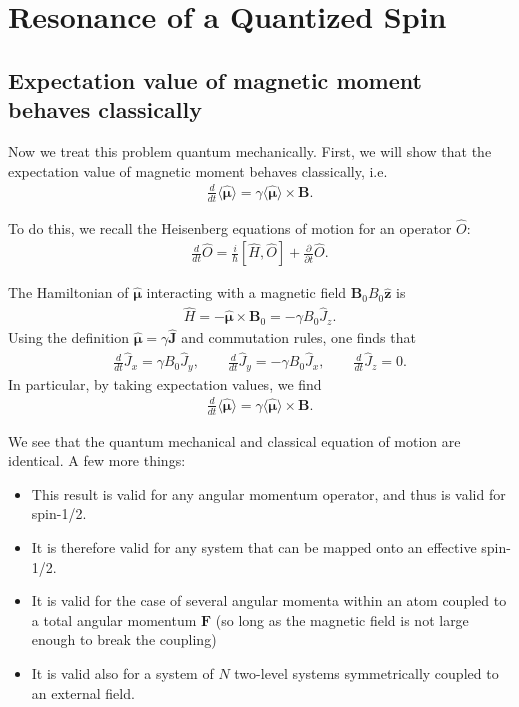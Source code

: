 \documentclass{book}
\theoremstyle{definition}
\newcommand{\p}{\partial}
\newcommand{\f}[2]{\frac{#1}{#2}}
\begin{document}
\section{Resonance of a Quantized Spin}




\subsection{Expectation value of magnetic moment behaves classically}


Now we treat this problem quantum mechanically. First, we will show that the expectation value of magnetic moment behaves classically, i.e. 
\begin{align*}
	\f{d}{dt}\langle \hat{\bm{\mu}} \rangle = \gamma \langle \hat{\bm{\mu}}\rangle \times \bm{B}.
\end{align*}

To do this, we recall the Heisenberg equations of motion for an operator $\hat{O}$:
\begin{align*}
	\f{d}{dt}\hat{O} = \f{i}{\hbar}[\hat{H}, \hat{O}] + \f{\p}{\p t}\hat{O}.
\end{align*}

The Hamiltonian of $\hat{\bm{\mu}}$ interacting with a magnetic field $\bm{B}_0  B_0 \hat{\bm{z}}$ is
\begin{align*}
	\hat{H} = -\hat{\bm{\mu}} \times \bm{B}_0 = -\gamma B_0 \hat{J}_z.
\end{align*}
Using the definition $\hat{\bm{\mu}} = \gamma \hat{\bm{J}}$ and commutation rules, one finds that 
\begin{align*}
	\f{d}{dt}\hat{J}_x = \gamma B_0 \hat{J}_y, \quad\quad \f{d}{dt}\hat{J}_y = -\gamma B_0 \hat{J}_x, \quad\quad \f{d}{dt}\hat{J}_z = 0.
\end{align*}
In particular, by taking expectation values, we find 
\begin{align*}
	\f{d}{dt}\langle \hat{\bm{\mu}} \rangle = \gamma \langle \hat{\bm{\mu}}\rangle \times \bm{B}.
\end{align*}


We see that the quantum mechanical and classical equation of motion are identical. A few more things:
\begin{itemize}
	\item This result is valid for any angular momentum operator, and thus is valid for spin-1/2.
	
	\item It is therefore valid for any system that can be mapped onto an effective spin-1/2.
	
	\item It is valid for the case of several angular momenta within an atom coupled to a total angular momentum $\bm{F}$ (so long as the magnetic field is not large enough to break the coupling)
	
	\item It is valid also for a system of $N$ two-level systems symmetrically coupled to an external field. 
\end{itemize} 
\end{document}
